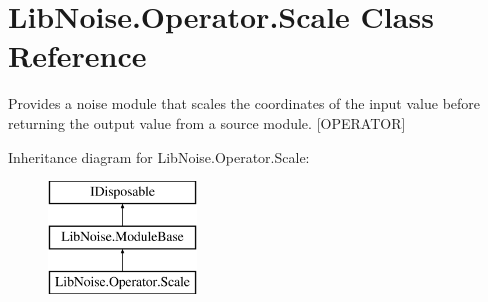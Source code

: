 \hypertarget{class_lib_noise_1_1_operator_1_1_scale}{}\section{Lib\+Noise.\+Operator.\+Scale Class Reference}
\label{class_lib_noise_1_1_operator_1_1_scale}


Provides a noise module that scales the coordinates of the input value before returning the output value from a source module. \mbox{[}O\+P\+E\+R\+A\+T\+OR\mbox{]}  


Inheritance diagram for Lib\+Noise.\+Operator.\+Scale\+:\begin{figure}[H]
\begin{center}
\leavevmode
\includegraphics[height=3.000000cm]{class_lib_noise_1_1_operator_1_1_scale}
\end{center}
\end{figure}
